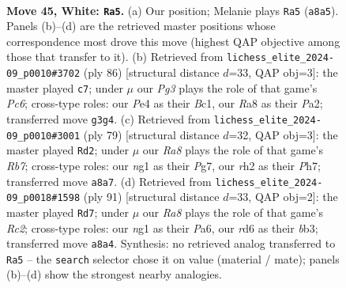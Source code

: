 \documentclass[11pt]{article}
\begin{document}
\clearpage

\begin{figure}[p]\centering
\begin{subfigure}{0.46\textwidth}\centering
\resizebox{\linewidth}{!}{%
\newchessgame
\chessboard[
  setfen={R7/5p1p/3r2pk/8/1p2P3/4K1Pb/7r/6n1 w - - 0 45},
  showmover=false,
  pgfstyle=straightmove, color=movearrow, markmove={a8-a5}
]}
\caption{}
\end{subfigure}\hfill
\begin{subfigure}{0.46\textwidth}\centering
\resizebox{\linewidth}{!}{%
\newchessgame
\chessboard[
  setfen={6k1/p5b1/2P5/7R/1p2P3/2pp1r2/P7/2B1K3 w - - 0 44},
  showmover=false,
  pgfstyle=straightmove, color=movearrow, markmove={c6-c7}
]}
\caption{}
\end{subfigure}
\\[4pt]
\begin{subfigure}{0.46\textwidth}\centering
\resizebox{\linewidth}{!}{%
\newchessgame
\chessboard[
  setfen={8/6pp/8/3p1k2/R2P3P/P5PK/1r6/8 b - - 0 40},
  showmover=false,
  pgfstyle=straightmove, color=movearrow, markmove={b2-d2}
]}
\caption{}
\end{subfigure}\hfill
\begin{subfigure}{0.46\textwidth}\centering
\resizebox{\linewidth}{!}{%
\newchessgame
\chessboard[
  setfen={8/2r5/p7/4k3/1p6/1B5P/P2PNPP1/6K1 b - - 3 46},
  showmover=false,
  pgfstyle=straightmove, color=movearrow, markmove={c7-d7}
]}
\caption{}
\end{subfigure}
\caption{\textbf{Move 45, White: \texttt{Ra5}.} (a) Our position; Melanie plays \texttt{Ra5} (\texttt{a8a5}). Panels (b)--(d) are the retrieved master positions whose correspondence most drove this move (highest QAP objective among those that transfer to it). (b) Retrieved from \texttt{lichess\_elite\_2024-09\_p0010\#3702} (ply 86) [structural distance $d$=33, QAP obj=3]: the master played \texttt{c7}; under $\mu$ our \emph{Pg3} plays the role of that game's \emph{Pc6}; cross-type roles: our \emph{P}e4 as their \emph{B}c1, our \emph{R}a8 as their \emph{P}a2; transferred move \texttt{g3g4}. (c) Retrieved from \texttt{lichess\_elite\_2024-09\_p0010\#3001} (ply 79) [structural distance $d$=32, QAP obj=3]: the master played \texttt{Rd2}; under $\mu$ our \emph{Ra8} plays the role of that game's \emph{Rb7}; cross-type roles: our \emph{n}g1 as their \emph{P}g7, our \emph{r}h2 as their \emph{P}h7; transferred move \texttt{a8a7}. (d) Retrieved from \texttt{lichess\_elite\_2024-09\_p0018\#1598} (ply 91) [structural distance $d$=33, QAP obj=2]: the master played \texttt{Rd7}; under $\mu$ our \emph{Ra8} plays the role of that game's \emph{Rc2}; cross-type roles: our \emph{n}g1 as their \emph{P}a6, our \emph{r}d6 as their \emph{b}b3; transferred move \texttt{a8a4}. Synthesis: no retrieved analog transferred to \texttt{Ra5} -- the \texttt{search} selector chose it on value (material / mate); panels (b)--(d) show the strongest nearby analogies.}
\label{fig:thought-m88}
\end{figure}
\end{document}
